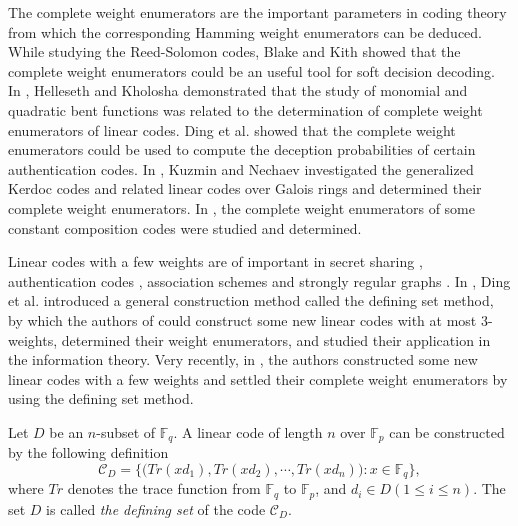 \documentclass[final,1p,times]{elsarticle}
\begin{document}
The complete weight enumerators are the important parameters in coding theory from which the corresponding Hamming weight enumerators can be  deduced. While studying the Reed-Solomon codes, Blake and Kith showed that the complete weight enumerators could be an useful tool for soft decision decoding\cite{B20}. In \cite{B21}, Helleseth and Kholosha demonstrated that the study of monomial and quadratic bent functions was related to the determination of complete weight enumerators of linear codes. Ding et al. \cite{B22,B23} showed that the complete weight enumerators could be used to compute the deception probabilities of certain authentication codes.  In \cite{B24,B25}, Kuzmin and Nechaev investigated the generalized Kerdoc codes and related linear codes over Galois rings and determined their complete weight enumerators. In \cite{B26,B27,B28}, the complete weight enumerators of some constant composition codes were studied and determined. 


Linear codes with a few weights are of important in secret sharing \cite{B29,B30}, authentication codes \cite{B22}, association schemes \cite{Bib2} and strongly regular graphs \cite{B31}. In \cite{Bib3,Bib4}, Ding et al. introduced a general construction method called the defining set method,  by which the  authors of \cite{Bib5, Bib6, Bib7,Bib8} could construct some new linear codes with at most 3-weights, determined their weight enumerators, and studied their application in the information theory. Very recently, in \cite{Bib8,B32,B33,B34,B35,B36}, the authors constructed some new linear codes with a few weights and settled their complete weight enumerators by using the defining set method.

Let $ D $ be an $ n $-subset of $ \mathbb{F}_{q} $. A linear code of length $ n $ over $ \mathbb{F}_{p} $ can be constructed by the following definition 
\begin{equation*}
\mathcal{C}_{D}=\bigl\lbrace\bigl(Tr(xd_{1}),Tr(xd_{2}),\cdots,Tr(xd_{n})\bigr):x\in \mathbb{F}_{q} \bigr\rbrace,
\end{equation*}
where $ Tr $ denotes the trace function from $ \mathbb{F}_{q} $ to $ \mathbb{F}_{p} $, and $ d_{i}\in D (1\leq i\leq n) $. The set $ D $ is called \textit{the defining set} of the code $ \mathcal{C}_{D} $. 
\end{document}
